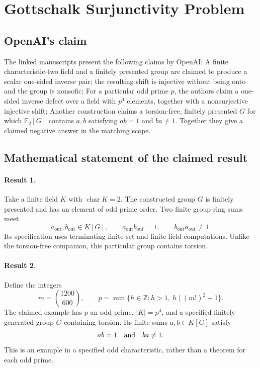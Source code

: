 \documentclass[11pt]{article}
\begin{document}
\section*{Gottschalk Surjunctivity Problem}

\subsection{OpenAI's claim}
The linked manuscripts present the following claims by OpenAI: A finite characteristic-two field and a finitely presented group are claimed to produce a scalar one-sided inverse pair; the resulting shift is injective without being onto and the group is nonsofic; For a particular odd prime $p$, the authors claim a one-sided inverse defect over a field with $p^4$ elements, together with a nonsurjective injective shift; Another construction claims a torsion-free, finitely presented $G$ for which $\mathbb F_2[G]$ contains $a,b$ satisfying $ab=1$ and $ba\ne1$. Together they give a claimed negative answer in the matching scope.

\subsection{Mathematical statement of the claimed result}
\paragraph{Result 1.} Take a finite field \(K\) with \(\operatorname{char}K=2\). The constructed group \(G\) is finitely presented and has an element of odd prime order. Two finite group-ring sums meet
\[
 a_{\mathrm{out}},b_{\mathrm{out}}\in K[G],\qquad
 a_{\mathrm{out}}b_{\mathrm{out}}=1,\qquad
 b_{\mathrm{out}}a_{\mathrm{out}}\ne1.
\]
Its specification uses terminating finite-set and finite-field computations. Unlike the torsion-free companion, this particular group contains torsion.

\paragraph{Result 2.} Define the integers
\[
 m=\binom{1200}{600},\qquad
 p=\min\{h\in\mathbb Z:h>1,\ h\mid(m!)^2+1\}.
\]
The claimed example has \(p\) an odd prime, \(|K|=p^4\), and a specified finitely generated group \(G\) containing torsion. Its finite sums \(a,b\in K[G]\) satisfy
\[
 ab=1\quad\hbox{and}\quad ba\ne1.
\]
This is an example in a specified odd characteristic, rather than a theorem for each odd prime.
\end{document}
